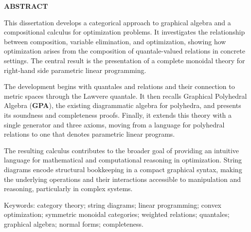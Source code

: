 \newpage
\thispagestyle{empty}
\begin{center}
  \textbf{\MakeUppercase{Abstract}}
\end{center}

\noindent
This dissertation develops a categorical approach to graphical algebra and a
compositional calculus for optimization problems. It investigates the
relationship between composition, variable elimination, and optimization,
showing how optimization arises from the composition of quantale-valued
relations in concrete settings. The central result is the presentation of a
complete monoidal theory for right-hand side parametric linear programming.

The development begins with quantales and relations and their connection to
metric spaces through the Lawvere quantale. It then recalls Graphical
Polyhedral Algebra (\textbf{GPA}), the existing diagrammatic algebra for
polyhedra, and presents its soundness and completeness proofs. Finally, it
extends this theory with a single generator and three axioms, moving from a
language for polyhedral relations to one that denotes parametric linear
programs.

The resulting calculus contributes to the broader goal of providing an
intuitive language for mathematical and computational reasoning in
optimization. String diagrams encode structural bookkeeping in a compact
graphical syntax, making the underlying operations and their interactions
accessible to manipulation and reasoning, particularly in complex systems.

\vspace{1em}
\noindent
Keywords: category theory; string diagrams; linear programming; convex
optimization; symmetric monoidal categories; weighted relations; quantales;
graphical algebra; normal forms; completeness.
\clearpage

